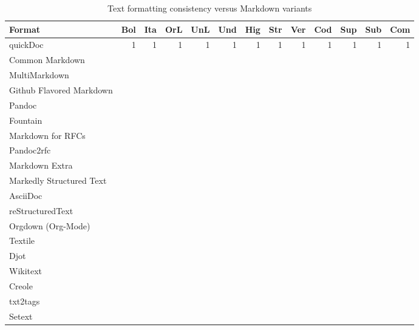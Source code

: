 \documentclass[a4paper,12pt]{article}
\begin{document}
\begin{table}[htbp]
\caption{\label{tab:org79aea84}Text formatting consistency versus Markdown variants}
\centering
\begin{tabular}{lrrrrrrrrrrrr}
\hline
Format & Bol & Ita & OrL & UnL & Und & Hig & Str & Ver & Cod & Sup & Sub & Com\\
\hline
quickDoc & 1 & 1 & 1 & 1 & 1 & 1 & 1 & 1 & 1 & 1 & 1 & 1\\
Common Markdown\autocite{johnmacfarlaneCommonMarkSpec2024} &  &  &  &  &  &  &  &  &  &  &  & \\
MultiMarkdown\autocite{fletchert.penneyMultiMarkdownUsersGuide2023} &  &  &  &  &  &  &  &  &  &  &  & \\
Github Flavored Markdown\autocite{GitHubFlavoredMarkdown2019} &  &  &  &  &  &  &  &  &  &  &  & \\
Pandoc\autocite{johnmacfarlanePandocUsersGuide2025} &  &  &  &  &  &  &  &  &  &  &  & \\
Fountain\autocite{SyntaxFountain} &  &  &  &  &  &  &  &  &  &  &  & \\
Markdown for RFCs\autocite{thomasleitnerKramdownSyntax} &  &  &  &  &  &  &  &  &  &  &  & \\
Pandoc2rfc &  &  &  &  &  &  &  &  &  &  &  & \\
Markdown Extra\autocite{PHPMarkdownExtra} &  &  &  &  &  &  &  &  &  &  &  & \\
Markedly Structured Text\autocite{JupyterbookMystmd2025} &  &  &  &  &  &  &  &  &  &  &  & \\
AsciiDoc &  &  &  &  &  &  &  &  &  &  &  & \\
reStructuredText &  &  &  &  &  &  &  &  &  &  &  & \\
Orgdown (Org-Mode) &  &  &  &  &  &  &  &  &  &  &  & \\
Textile &  &  &  &  &  &  &  &  &  &  &  & \\
Djot &  &  &  &  &  &  &  &  &  &  &  & \\
Wikitext &  &  &  &  &  &  &  &  &  &  &  & \\
Creole &  &  &  &  &  &  &  &  &  &  &  & \\
txt2tags &  &  &  &  &  &  &  &  &  &  &  & \\
Setext &  &  &  &  &  &  &  &  &  &  &  & \\
\hline
\end{tabular}
\end{table}
\end{document}
